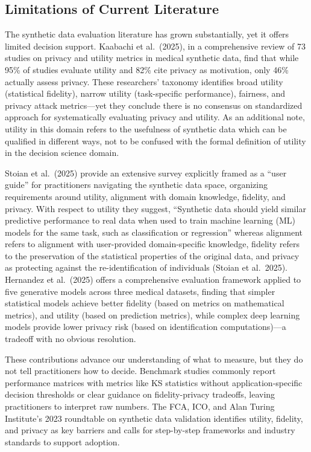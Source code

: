 \documentclass[12pt,a4paper]{article}
\begin{document}
\subsection{Limitations of Current Literature}

The synthetic data evaluation literature has grown substantially, yet it offers limited decision support. Kaabachi et al.\ (2025), in a comprehensive review of 73 studies on privacy and utility metrics in medical synthetic data, find that while 95\% of studies evaluate utility and 82\% cite privacy as motivation, only 46\% actually assess privacy. These researchers' taxonomy identifies broad utility (statistical fidelity), narrow utility (task-specific performance), fairness, and privacy attack metrics---yet they conclude there is no consensus on standardized approach for systematically evaluating privacy and utility. As an additional note, utility in this domain refers to the usefulness of synthetic data which can be qualified in different ways, not to be confused with the formal definition of utility in the decision science domain.

Stoian et al.\ (2025) provide an extensive survey explicitly framed as a ``user guide'' for practitioners navigating the synthetic data space, organizing requirements around utility, alignment with domain knowledge, fidelity, and privacy. With respect to utility they suggest, ``Synthetic data should yield similar predictive performance to real data when used to train machine learning (ML) models for the same task, such as classification or regression'' whereas alignment refers to alignment with user-provided domain-specific knowledge, fidelity refers to the preservation of the statistical properties of the original data, and privacy as protecting against the re-identification of individuals (Stoian et al.\ 2025). Hernandez et al.\ (2025) offers a comprehensive evaluation framework applied to five generative models across three medical datasets, finding that simpler statistical models achieve better fidelity (based on metrics on mathematical metrics), and utility (based on prediction metrics), while complex deep learning models provide lower privacy risk (based on identification computations)---a tradeoff with no obvious resolution.

These contributions advance our understanding of what to measure, but they do not tell practitioners how to decide. Benchmark studies commonly report performance matrices with metrics like KS statistics without application-specific decision thresholds or clear guidance on fidelity-privacy tradeoffs, leaving practitioners to interpret raw numbers. The FCA, ICO, and Alan Turing Institute's 2023 roundtable on synthetic data validation identifies utility, fidelity, and privacy as key barriers and calls for step-by-step frameworks and industry standards to support adoption.
\end{document}
